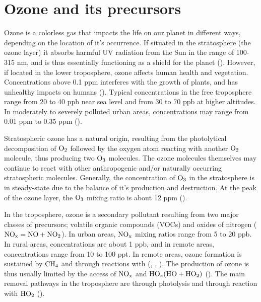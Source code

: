 



\section{Ozone and its precursors}\label{sec:ozone_and_precursors}

Ozone is a colorless gas that impacts the life on our planet in different ways, depending on the location of it's occurrence. If situated in the stratosphere (the ozone layer) it absorbs harmful UV radiation from the Sun in the range of 100-315 nm, and is thus essentially functioning as a shield for the planet (\cite{SeinfeldSpyros}). However, if located in the lower troposphere, ozone affects human health and vegetation. Concentrations above 0.1 \acrfull{ppm} interferes with the growth of plants, and has unhealthy impacts on humans (\cite{AtmModFund}). Typical concentrations in the free troposphere range from 20 to 40 \acrfull{ppb} near sea level and from 30 to 70 ppb at higher altitudes. In moderately to severely polluted urban areas, concentrations may range from 0.01 ppm to 0.35 ppm (\cite{AtmModFund}).  

\medskip

Stratospheric ozone has a natural origin, resulting from the photolytical decomposition of $\mathrm{O_2}$ followed by the oxygen atom reacting with another $\mathrm{O_2}$ molecule, thus producing two $\mathrm{O_3}$ molecules. The ozone molecules themselves may continue to react with other anthropogenic and/or naturally occurring stratospheric molecules. Generally, the concentration of $\mathrm{O_3}$ in the stratosphere is in steady-state due to the balance of it's production and destruction. At the peak of the ozone layer, the $\mathrm{O_3}$ mixing ratio is about 12 ppm (\cite{SeinfeldSpyros}).  

\medskip

In the troposphere, ozone is a secondary pollutant resulting from two major classes of precursors; volatile organic compounds (VOCs) and oxides of nitrogen ($\mathrm{NO_x} = \mathrm{NO} + \mathrm{NO_2}$). In urban areas, $\mathrm{NO_x}$ mixing ratios range from 5 to 20 ppb. In rural areas, concentrations are about 1 ppb, and in remote areas, concentrations range from 10 to 100 ppt. In remote areas, ozone formation is sustained by $\mathrm{CH_4}$ and  through reactions with  (\cite{Cadle1970}, \cite{Levy1971}, \cite{SeinfeldSpyros}). The production of ozone is thus usually limited by the access of $\mathrm{NO_x}$ and $\mathrm{HO_x} (\mathrm{HO} + \mathrm{HO_2})$ (\cite{Levy1971}). The main removal pathways in the troposphere are through photolysis and through reaction with $\mathrm{HO_2}$ (\cite{SeinfeldSpyros}).

